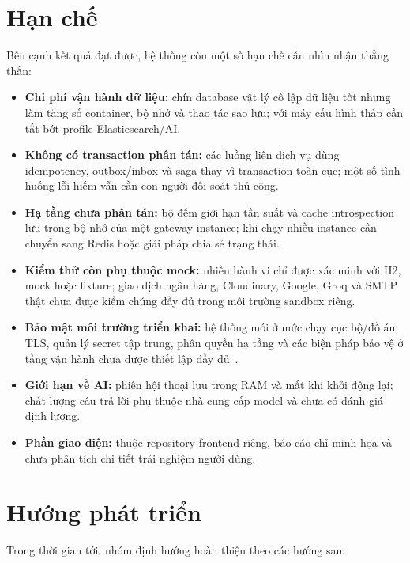\section{Hạn chế}
\label{sec:han-che}

Bên cạnh kết quả đạt được, hệ thống còn một số hạn chế cần nhìn nhận thẳng thắn:

\begin{itemize}
  \item \textbf{Chi phí vận hành dữ liệu:} chín database vật lý cô lập dữ liệu tốt nhưng làm tăng số container, bộ nhớ và thao tác sao lưu; với máy cấu hình thấp cần tắt bớt profile Elasticsearch/AI.
  \item \textbf{Không có transaction phân tán:} các luồng liên dịch vụ dùng idempotency, outbox/\hspace{0pt}inbox và saga thay vì transaction toàn cục; một số tình huống lỗi hiếm vẫn cần con người đối soát thủ công.
  \item \textbf{Hạ tầng chưa phân tán:} bộ đếm giới hạn tần suất và cache introspection lưu trong bộ nhớ của một gateway instance; khi chạy nhiều instance cần chuyển sang Redis hoặc giải pháp chia sẻ trạng thái.
  \item \textbf{Kiểm thử còn phụ thuộc mock:} nhiều hành vi chỉ được xác minh với H2, mock hoặc fixture; giao dịch ngân hàng, Cloudinary, Google, Groq và SMTP thật chưa được kiểm chứng đầy đủ trong môi trường sandbox riêng.
  \item \textbf{Bảo mật môi trường triển khai:} hệ thống mới ở mức chạy cục bộ/đồ án; TLS, quản lý secret tập trung, phân quyền hạ tầng và các biện pháp bảo vệ ở tầng vận hành chưa được thiết lập đầy đủ~\cite{owasp}.
  \item \textbf{Giới hạn về AI:} phiên hội thoại lưu trong RAM và mất khi khởi động lại; chất lượng câu trả lời phụ thuộc nhà cung cấp model và chưa có đánh giá định lượng.
  \item \textbf{Phần giao diện:} thuộc repository frontend riêng, báo cáo chỉ minh họa và chưa phân tích chi tiết trải nghiệm người dùng.
\end{itemize}

\section{Hướng phát triển}
\label{sec:huong-phat-trien}

Trong thời gian tới, nhóm định hướng hoàn thiện theo các hướng sau:

